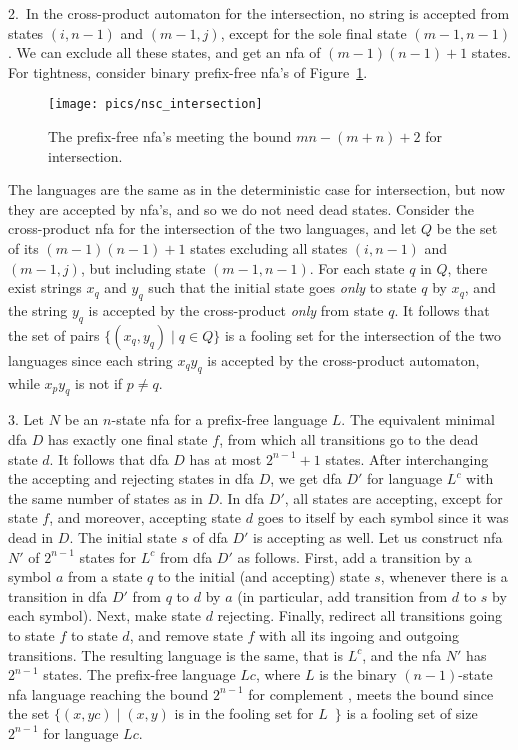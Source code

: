 \documentclass[copyright]{eptcs}
\begin{document}
\label{nsc_intersection}
  2.~In the cross-product automaton for the intersection,
  no string is accepted from states $(i,n-1)$ and $(m-1,j)$,
  except for the sole final state $(m-1,n-1)$.
  We can exclude all these states, and get an nfa of $(m-1)(n-1)+1$ states.
  For tightness, consider binary prefix-free
   nfa's of Figure~\ref{fig:nsc_intersection}.
  \begin{figure}[tb]
  \centerline{\texttt{[image: pics/nsc\_intersection]}}
  \caption{The prefix-free  nfa's
           meeting the  bound $mn-(m+n)+2$ for intersection.}
  \label{fig:nsc_intersection}
  \end{figure}
  The languages are the same as in the deterministic case for intersection,
  but now they are accepted by nfa's, and so we do not need  dead states.
  Consider the cross-product nfa for the intersection of the two languages,
  and let $Q$ be the set of its $(m-1)(n-1)+1$ states excluding all states
  $(i,n-1)$ and $(m-1,j)$, but including state $(m-1,n-1)$.
   For each state $q$ in $Q$,
  there exist strings $x_q$ and $y_q$
  such that the initial state goes \emph{only} to state $q$ by $x_q$,
  and the string $y_q$ is accepted by the cross-product \emph{only} 
  from state $q$.
  It follows that  the set of pairs $\{(x_q,y_q) \mid q\in Q\}$
  is a fooling set for the intersection of the two languages
  since each string $x_qy_q$ is accepted by the cross-product automaton,
  while $x_py_q$ is not if $p\neq q$.

\label{part3}
  3. Let $N$ be an $n$-state  nfa for a prefix-free language $L$.
  The equivalent minimal dfa $D$ has exactly one final state $f$,
  from which all transitions go to the dead state $d$.
  It follows that  dfa $D$ has at most $2^{n-1}+1$ states.
  After interchanging the accepting and rejecting states in dfa $D$,
  we get  dfa $D'$ for  language $L^c$ 
  with the same number of states as in  $D$.
  In  dfa $D'$, all states are accepting, except for state $f$,
  and moreover, accepting state $d$ goes to itself 
  by each symbol since it was dead in $D$.
  The initial state $s$ of  dfa $D'$ is accepting as well.
  Let us construct  nfa $N'$ of $2^{n-1}$ states 
  for $L^c$ from  dfa $D'$ as follows.
  First, add a transition by a symbol $a$ from a state $q$
  to the initial (and accepting) state $s$,
  whenever  there is a transition in  dfa $D'$ from $q$ to $d$ by $a$
  (in particular,  add transition from $d$ to $s$ by each symbol).
  Next,   make state $d$ rejecting. 
  Finally,  redirect all transitions going to state $f$ to state $d$,
  and remove state $f$ with all its ingoing and outgoing transitions. 
  The resulting language is  the same, that is $L^c$,
  and the nfa $N'$ has $2^{n-1}$ states. 
  The prefix-free language $L c$, where $L$ is the binary $(n-1)$-state 
  nfa language   reaching the bound $2^{n-1}$ for complement \cite{ji05},
  meets the bound since  the set
    $\{(x,yc) \mid (x,y)$ is in the fooling set for $L$\  \cite{ji05}$\}$
  is a fooling set of size $2^{n-1}$ for language $L c$.
\end{document}

